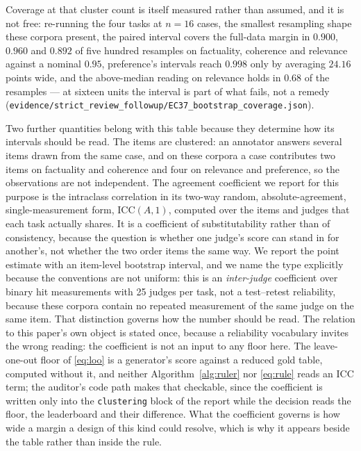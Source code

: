 \documentclass{article}
\newcommand{\ids}[1]{\texttt{\small #1}} %
\begin{document}
Coverage at that cluster count is itself measured rather than assumed, and it is not free: re-running the four tasks at $n=16$ cases, the smallest resampling shape these corpora present, the paired interval covers the full-data margin in $0.900$, $0.960$ and $0.892$ of five hundred resamples on factuality, coherence and relevance against a nominal $0.95$, preference's intervals reach $0.998$ only by averaging $24.16$ points wide, and the above-median reading on relevance holds in $0.68$ of the resamples --- at sixteen units the interval is part of what fails, not a remedy (\ids{evidence/strict\_review\_followup/EC37\_bootstrap\_coverage.json}).

Two further quantities belong with this table because they determine how its intervals should be read. The items are clustered: an annotator answers several items drawn from the same case, and on these corpora a case contributes two items on factuality and coherence and four on relevance and preference, so the observations are not independent. The agreement coefficient we report for this purpose is the intraclass correlation in its two-way random, absolute-agreement, single-measurement form, $\mathrm{ICC}(A,1)$, computed over the items and judges that each task actually shares. It is a coefficient of substitutability rather than of consistency, because the question is whether one judge's score can stand in for another's, not whether the two order items the same way. We report the point estimate with an item-level bootstrap interval, and we name the type explicitly because the conventions are not uniform: this is an \emph{inter-judge} coefficient over binary hit measurements with 25 judges per task, not a test--retest reliability, because these corpora contain no repeated measurement of the same judge on the same item. That distinction governs how the number should be read. The relation to this paper's own object is stated once, because a reliability vocabulary invites the wrong reading: the coefficient is not an input to any floor here. The leave-one-out floor of \eqref{eq:loo} is a generator's score against a reduced gold table, computed without it, and neither Algorithm~\ref{alg:ruler} nor \eqref{eq:rule} reads an $\mathrm{ICC}$ term; the auditor's code path makes that checkable, since the coefficient is written only into the \texttt{clustering} block of the report while the decision reads the floor, the leaderboard and their difference. What the coefficient governs is how wide a margin a design of this kind could resolve, which is why it appears beside the table rather than inside the rule.
\end{document}
